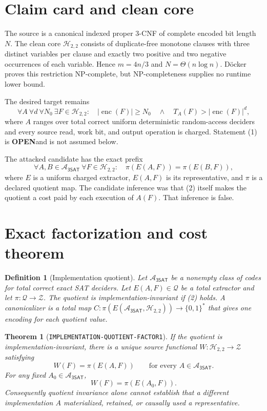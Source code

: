 \documentclass[11pt]{article}
\newtheorem{definition}{Definition}
\newtheorem{theorem}{Theorem}
\newcommand{\SAT}{\mathsf{3SAT}}
\newcommand{\Htwo}{\mathcal H_{2,2}}
\newcommand{\OPEN}{\textbf{OPEN}}
\begin{document}
\section{Claim card and clean core}

The source is a canonical indexed proper 3-CNF of complete encoded bit length
$N$.  The clean core $\Htwo$ consists of duplicate-free monotone clauses with
three distinct variables per clause and exactly two positive and two negative
occurrences of each variable.  Hence $m=4n/3$ and $N=\Theta(n\log n)$.
D\"ocker proves this restriction NP-complete, but NP-completeness supplies no
runtime lower bound.

The desired target remains
\[
 \forall A\ \forall d\ \forall N_0\ \exists F\in\Htwo:\quad
 |\operatorname{enc}(F)|\ge N_0
 \quad\land\quad
 T_A(F)>|\operatorname{enc}(F)|^d,                         \tag{1}
\]
where $A$ ranges over total correct uniform deterministic random-access
deciders and every source read, work bit, and output operation is charged.
Statement (1) is \OPEN and is not assumed below.

The attacked candidate has the exact prefix
\[
 \forall A,B\in\mathcal A_{\SAT}\ \forall F\in\Htwo:\quad
 \pi(E(A,F))=\pi(E(B,F)),                                  \tag{2}
\]
where $E$ is a uniform charged extractor, $E(A,F)$ is its representative,
and $\pi$ is a declared quotient map.  The candidate inference was that (2)
itself makes the quotient a cost paid by each execution of $A(F)$.  That
inference is false.

\section{Exact factorization and cost theorem}

\begin{definition}[Implementation quotient]
Let $\mathcal A_{\SAT}$ be a nonempty class of codes for total correct exact
SAT deciders.  Let $E(A,F)\in\mathcal Q$ be a total extractor and let
$\pi:\mathcal Q\to\mathcal Z$.  The quotient is implementation-invariant if
(2) holds.  A canonicalizer is a total map
$C:\pi(E(\mathcal A_{\SAT},\Htwo))\to\{0,1\}^*$ that gives one encoding for
each quotient value.
\end{definition}

\begin{theorem}[\texttt{IMPLEMENTATION-QUOTIENT-FACTOR1}]
If the quotient is implementation-invariant, there is a unique source
functional $W:\Htwo\to\mathcal Z$ satisfying
\[
 W(F)=\pi(E(A,F))\qquad
 \text{for every }A\in\mathcal A_{\SAT}.                  \tag{3}
\]
For any fixed $A_0\in\mathcal A_{\SAT}$,
\[
 W(F)=\pi(E(A_0,F)).                                       \tag{4}
\]
Consequently quotient invariance alone cannot establish that a different
implementation $A$ materialized, retained, or causally used a representative.
\end{theorem}
\end{document}
